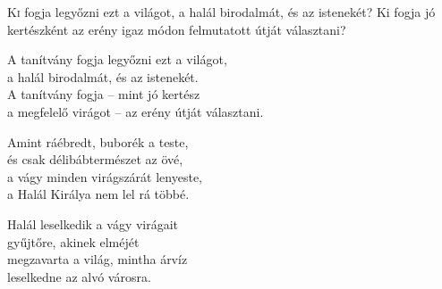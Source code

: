 
\begin{firstdhpverse}{44}
\lettrine[slope=0.5em]{K}{i} {\LettrineTextFont fogja legyőzni ezt a világot,}\newline
a halál birodalmát, és az istenekét?\newline
Ki fogja jó kertészként az erény\newline
igaz módon felmutatott útját választani?
\end{firstdhpverse}

\begin{dhpverse}

 A tanítvány fogja legyőzni ezt a világot,\\
a halál birodalmát, és az istenekét.\\
A tanítvány fogja – mint jó kertész\\
a megfelelő virágot – az erény útját választani.

 Amint ráébredt, buborék a teste,\\
és csak délibábtermészet az övé,\\
a vágy minden virágszárát lenyeste,\\
a Halál Királya nem lel rá többé.

 Halál leselkedik a vágy virágait\\
gyűjtőre, akinek elméjét\\
megzavarta a világ, mintha árvíz\\
leselkedne az alvó városra.

\end{dhpverse}
\newpage
